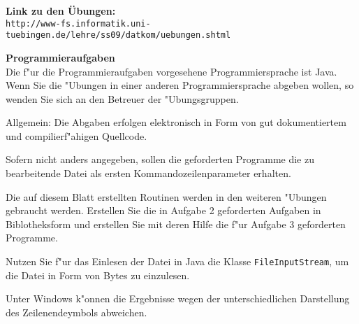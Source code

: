 \documentclass[a4paper]{article}
\begin{document}
\bigskip 
{\bf Link zu den \"Ubungen:}\\
\verb$http://www-fs.informatik.uni-tuebingen.de/lehre/ss09/datkom/uebungen.shtml$

\newpage

{\bf Programmieraufgaben}\\
Die f"ur die Programmieraufgaben vorgesehene Programmiersprache ist Java. Wenn Sie die "Ubungen in einer anderen Programmiersprache abgeben wollen, so wenden Sie sich an den Betreuer der "Ubungsgruppen.

Allgemein: Die Abgaben erfolgen elektronisch in Form von gut dokumentiertem und compilierf"ahigen Quellcode.

Sofern nicht anders angegeben, sollen die geforderten Programme die zu bearbeitende Datei als ersten Kommandozeilenparameter erhalten.

Die auf diesem Blatt erstellten Routinen werden in den weiteren "Ubungen gebraucht werden. Erstellen Sie die in Aufgabe 2 geforderten Aufgaben in Biblotheksform und erstellen Sie mit deren Hilfe die f"ur Aufgabe 3 geforderten Programme.

Nutzen Sie f"ur das Einlesen der Datei in Java die Klasse \verb$FileInputStream$, um die Datei in Form von Bytes zu einzulesen.

Unter Windows k"onnen die Ergebnisse wegen der unterschiedlichen Darstellung des Zeilenendeymbols abweichen.
\end{document}
